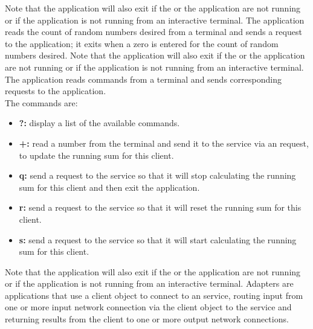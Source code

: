 Note that the application will also exit if the
 or the
 application are not running or if the application
is not running from an interactive terminal.
The  application reads the count of
random numbers desired from a terminal and sends a
 request to the
 application; it exits when a zero is
entered for the count of random numbers desired.
Note that the application will also exit if the
 or the
 application are not running or if the
application is not running from an interactive terminal.
The  application reads commands from a
terminal and sends corresponding requests to the
 application.\\

The commands are:
\begin{itemize}
\item \textbf{?:} display a list of the available commands.
\item \textbf{+:} read a number from the terminal and send it to the service via an
 request, to update the running sum for this
client.
\item \textbf{q:} send a  request to the
service so that it will stop calculating the running sum for this client and then exit the
application.
\item \textbf{r:} send a  request to the
service so that it will reset the running sum for this client.
\item \textbf{s:} send a  request to the
service so that it will start calculating the running sum for this client.
\end{itemize}
Note that the application will also exit if the
 or the
 application are not running or if the
application is not running from an interactive terminal.
\secondaryEnd{}
Adapters are applications that use a client object to connect to an \mplusm{} service,
routing input from one or more input \yarp{} network connection via the client object to
the service and returning results from the client to one or more output \yarp{} network
connections.\\


